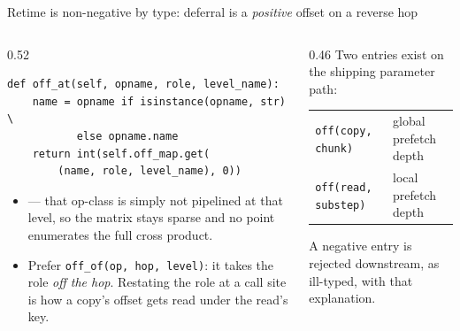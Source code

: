 \begin{frame}[fragile]{Retime is non-negative by type: deferral is a \emph{positive} offset on a reverse hop}
\begin{center}
\end{center}
\vspace{-4pt}
\begin{columns}[T]
\begin{column}{0.52\textwidth}
\begin{lstlisting}[style=py]
def off_at(self, opname, role, level_name):
    name = opname if isinstance(opname, str) \
           else opname.name
    return int(self.off_map.get(
        (name, role, level_name), 0))
\end{lstlisting}
\begin{itemize}\itemsep1pt
\item {} --- that op-class is simply not pipelined at that level, so the
      matrix stays sparse and no point enumerates the full cross product.
\item Prefer \texttt{off\_of(op, hop, level)}: it takes the role \emph{off the hop}. Restating
      the role at a call site is how a copy's offset gets read under the read's key.
\end{itemize}
\end{column}
\begin{column}{0.46\textwidth}
Two entries exist on the shipping parameter path:
\begin{center}\scriptsize
\begin{tabular}{ll}
\toprule
\texttt{off(copy, chunk)} & global prefetch depth \\
\texttt{off(read, substep)} & local prefetch depth \\
\bottomrule
\end{tabular}
\end{center}
\vspace{3pt}
\vspace{2pt}

 A negative entry is rejected downstream, as ill-typed,
with that explanation.
\end{column}
\end{columns}
\end{frame}
